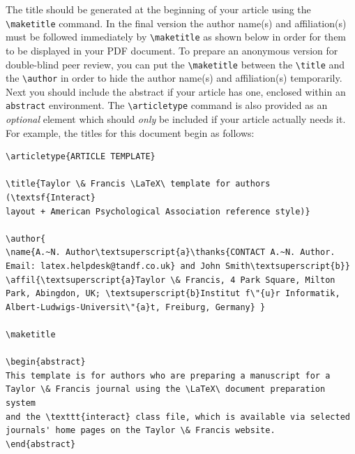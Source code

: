 \documentclass[]{interact}
\theoremstyle{plain}%
\theoremstyle{definition}
\theoremstyle{remark}
\begin{document}
The title should be generated at the beginning of your article using the \verb"\maketitle" command.
In the final version the author name(s) and affiliation(s) must be followed immediately by \verb"\maketitle" as shown below in order for them to be displayed in your PDF document.
To prepare an anonymous version for double-blind peer review, you can put the \verb"\maketitle" between the \verb"\title" and the \verb"\author" in order to hide the author name(s) and affiliation(s) temporarily.
Next you should include the abstract if your article has one, enclosed within an \texttt{abstract} environment.
The \verb"\articletype" command is also provided as an \emph{optional} element which should \emph{only} be included if your article actually needs it.
For example, the titles for this document begin as follows:
\begin{verbatim}
\articletype{ARTICLE TEMPLATE}

\title{Taylor \& Francis \LaTeX\ template for authors (\textsf{Interact}
layout + American Psychological Association reference style)}

\author{
\name{A.~N. Author\textsuperscript{a}\thanks{CONTACT A.~N. Author.
Email: latex.helpdesk@tandf.co.uk} and John Smith\textsuperscript{b}}
\affil{\textsuperscript{a}Taylor \& Francis, 4 Park Square, Milton
Park, Abingdon, UK; \textsuperscript{b}Institut f\"{u}r Informatik,
Albert-Ludwigs-Universit\"{a}t, Freiburg, Germany} }

\maketitle

\begin{abstract}
This template is for authors who are preparing a manuscript for a
Taylor \& Francis journal using the \LaTeX\ document preparation system
and the \texttt{interact} class file, which is available via selected
journals' home pages on the Taylor \& Francis website.
\end{abstract}
\end{verbatim}
\end{document}
